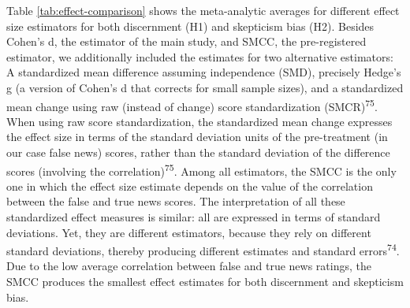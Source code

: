 \documentclass[
  doc,floatsintext]{apa6}
\begin{document}
Table \ref{tab:effect-comparison} shows the meta-analytic averages for different effect size estimators for both discernment (H1) and skepticism bias (H2). Besides Cohen's d, the estimator of the main study, and SMCC, the pre-registered estimator, we additionally included the estimates for two alternative estimators: A standardized mean difference assuming independence (SMD), precisely Hedge's g (a version of Cohen's d that corrects for small sample sizes), and a standardized mean change using raw (instead of change) score standardization (SMCR)\textsuperscript{75}. When using raw score standardization, the standardized mean change expresses the effect size in terms of the standard deviation units of the pre-treatment (in our case false news) scores, rather than the standard deviation of the difference scores (involving the correlation)\textsuperscript{75}. Among all estimators, the SMCC is the only one in which the effect size estimate depends on the value of the correlation between the false and true news scores. The interpretation of all these standardized effect measures is similar: all are expressed in terms of standard deviations. Yet, they are different estimators, because they rely on different standard deviations, thereby producing different estimates and standard errors\textsuperscript{74}. Due to the low average correlation between false and true news ratings, the SMCC produces the smallest effect estimates for both discernment and skepticism bias.
\end{document}
